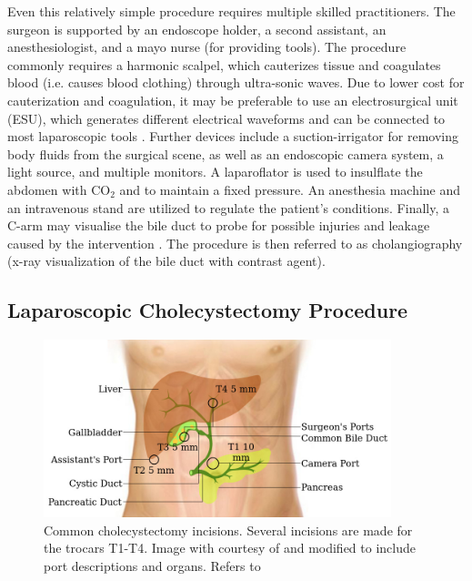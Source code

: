 Even this relatively simple procedure requires multiple skilled practitioners. The surgeon is supported by an endoscope holder, a second assistant, an anesthesiologist, and a mayo nurse (for providing tools). The procedure commonly requires a harmonic scalpel, which cauterizes tissue and coagulates blood (i.e. causes blood clothing) through ultra-sonic waves. Due to lower cost for cauterization and coagulation, it may be preferable to use an electrosurgical unit (ESU), which generates different electrical waveforms and can be connected to most laparoscopic tools \cite{archana2018comparing}. Further devices include a suction-irrigator for removing body fluids from the surgical scene, as well as an endoscopic camera system, a light source, and multiple monitors. A laparoflator is used to insulflate the abdomen with $\text{CO}_2$ and to maintain a fixed pressure. An anesthesia machine and an intravenous stand are utilized to regulate the patient's conditions. Finally, a C-arm may visualise the bile duct to probe for possible injuries and leakage caused by the intervention \cite{cuschieri1994intraoperative}. The procedure is then referred to as cholangiography (x-ray visualization of the bile duct with contrast agent).

\subsection{Laparoscopic Cholecystectomy Procedure}
\label{in:sec:cholecystectomy_procedure}
\begin{figure}[tb]
    \centering
    \includegraphics[width=0.9\textwidth]{introduction/fig/24_01_26_cholecystectomy_incisions.jpg}
    \caption{Common cholecystectomy incisions. Several incisions are made for the trocars T1-T4. Image with courtesy of \cite{ALES5766} and modified to include port descriptions and organs. Refers to }
    \label{in:fig:cholecystectomy_incisions}
\end{figure}

